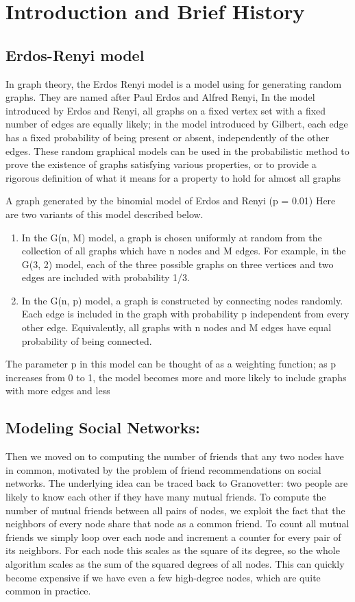
\section{Introduction and Brief History}
\subsection{Erdos-Renyi model}
In graph theory, the Erdos Renyi model is a model using for generating random graphs. They are named after Paul Erdos and Alfred Renyi, In the model introduced by Erdos and Renyi, all graphs on a fixed vertex set with a fixed number of edges are equally likely; in the model introduced by Gilbert, each edge has a fixed probability of being present or absent, independently of the other edges. These random graphical models can be used in the probabilistic method to prove the existence of graphs satisfying various properties, or to provide a rigorous definition of what it means for a property to hold for almost all graphs


A graph generated by the binomial model of Erdos and Renyi (p = 0.01) Here are two variants of this model described below.
\begin{enumerate}
\item In the G(n, M) model, a graph is chosen uniformly at random from the collection of all graphs which have n nodes and M edges. For example, in the G(3, 2) model, each of the three possible graphs on three vertices and two edges are included with probability 1/3.
\item In the G(n, p) model, a graph is constructed by connecting nodes randomly. Each edge is included in the graph with probability p independent from every other edge. Equivalently, all graphs with n nodes and M edges have equal probability of being connected.
\end{enumerate}


The parameter p in this model can be thought of as a weighting function; as p increases from 0 to 1, the model becomes more and more likely to include graphs with more edges and less 


\subsection{Modeling Social Networks:}
Then we moved on to computing the number of friends that any two nodes have in common, motivated by the problem of friend recommendations on social networks. The underlying idea can be traced back to Granovetter: two people are likely to know each other if they have many mutual friends. To compute the number of mutual friends between all pairs of nodes, we exploit the fact that the neighbors of every node share that node as a common friend. To count all mutual friends we simply loop over each node and increment a counter for every pair of its neighbors. For each node this scales as the square of its degree, so the whole algorithm scales as the sum of the squared degrees of all nodes. This can quickly become expensive if we have even a few high-degree nodes, which are quite common in practice.

